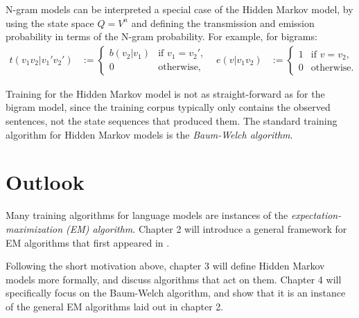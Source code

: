 N-gram models can be interpreted a special case of the Hidden Markov model, by
using the state space $Q = V^n$ and defining the transmission and emission
probability in terms of the N-gram probability. For example, for bigrams:
\begin{align*}
 t(v_1v_2|v_1'v_2') &:= \begin{cases}
  b(v_2|v_1) & \text{if } v_1 = v_2', \\
  0 &\text{otherwise},
 \end{cases} &
 e(v|v_1v_2) &:= \begin{cases}
  1 & \text{if } v = v_2, \\
  0 &\text{otherwise}.
 \end{cases}
\end{align*}

Training for the Hidden Markov model is not as straight-forward as for the
bigram model, since the training corpus typically only contains the observed
sentences, not the state sequences that produced them. The standard training
algorithm for Hidden Markov models is the \emph{Baum-Welch algorithm}.
\cite{baupetsouwei70,baum1972}

\section{Outlook}

Many training algorithms for language models are instances of the
\emph{expectation-maximization (EM) algorithm}. \cite{demlairub77} Chapter 2
will introduce a general framework for EM algorithms that first appeared in
\cite{bucstuvog15}.

Following the short motivation above, chapter 3 will define Hidden Markov
models more formally, and discuss algorithms that act on them. Chapter 4 will
specifically focus on the Baum-Welch algorithm, and show that it is an instance
of the general EM algorithms laid out in chapter 2.
